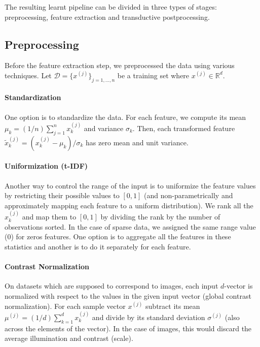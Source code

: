 The resulting learnt pipeline can be divided in three types
of stages: preprocessing, feature
extraction and transductive postprocessing.

\subsection{Preprocessing}\label{sec:preproc}


Before the feature extraction step, we preprocessed the data using various
techniques. Let $\mathcal{D}=\{ x^{(j)} \}_{j=1,\dots, n}$ be a training set
where $x^{(j)}\in\mathbb{R}^d$.

\paragraph{Standardization} One option is to standardize the data. For each
feature, we compute its mean $\mu_k=(1/n)\sum_{j=1}^n x^{(j)}_k$ and variance
$\sigma_k$. Then, each transformed feature $\tilde{x}^{(j)}_k=(x^{(j)}_k -
\mu_k )/ \sigma_k$ has zero mean and unit variance.

\paragraph{Uniformization (t-IDF)} Another way to control the range of the
input is to uniformize the feature values by restricting their possible values
to $[0,1]$ (and non-parametrically and approximately mapping each feature to a
uniform distribution). We rank all the $x^{(j)}_k$ and  map them to $[0,1]$ by
dividing the rank by the number of observations sorted. In the case of sparse data,
we assigned the same range value (0) for zeros features. One option is
to aggregate all the features in these statistics and another is to do it
separately for each feature.

\paragraph{Contrast Normalization} On datasets which are supposed to correspond
to images, each input $d$-vector is normalized with respect to the values
in the given input vector (global contrast normalization). For
each sample vector $x^{(j)}$ subtract its mean $\mu^{(j)}=(1/d)\sum_{k=1}^d
x^{(j)}_k$ and divide by its standard deviation $\sigma^{(j)}$ (also across the
elements of the vector).  In the case of images, this would discard the
average illumination and contrast (scale).

